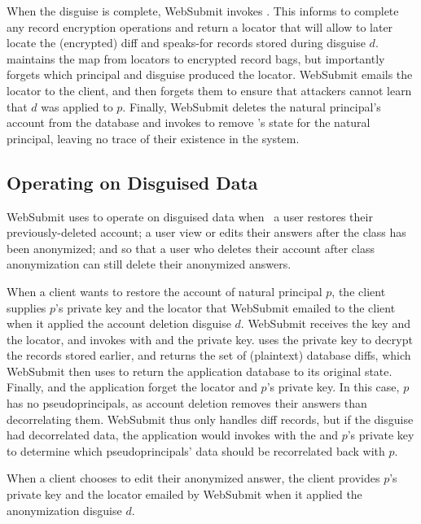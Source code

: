 %
When the disguise is complete, WebSubmit invokes .
%
This informs \sys to complete any record encryption operations and return a
locator  that will allow \sys to later locate the (encrypted) diff and
speaks-for records stored during disguise $d$.
%
\sys maintains the map from locators to encrypted record bags, but importantly
forgets which principal and disguise produced the locator.
%
WebSubmit emails the locator to the client, and then forgets them to ensure
that attackers cannot learn that $d$ was applied to $p$.
%
Finally, WebSubmit deletes the natural principal's account from the database and
invokes  to remove \sys's state for the natural principal,
leaving no trace of their existence in the system.
%

\subsection{Operating on Disguised Data}
\label{s:op-disg}

%
WebSubmit uses \sys to operate on disguised data when \one{} a user restores their
previously-deleted account; \two{} a user view or edits their answers after the
class has been anonymized; and \three{} so that a user who deletes their account
after class anonymization can still delete their anonymized answers.
%

%
When a client wants to restore the account of natural principal $p$, the client
supplies $p$'s private key and the locator  that WebSubmit emailed to
the client when it applied the account deletion disguise $d$.
%
WebSubmit receives the key and the locator, and invokes  with
 and the private key.
%
\sys uses the private key to decrypt the records stored earlier, and returns the
set of (plaintext) database diffs, which WebSubmit then uses to return the
application database to its original state.
%
Finally, \sys and the application forget the locator and $p$'s private key.
%
In this case, $p$ has no pseudoprincipals, as account deletion removes their
answers than decorrelating them.
%
WebSubmit thus only handles diff records, but if the disguise had decorrelated
data, the application would invokes  with the 
and $p$'s private key to determine which pseudoprincipals' data should be
recorrelated back with $p$.
%

%
When a client chooses to edit their anonymized answer, the client provides $p$'s
private key and the locator  emailed by WebSubmit when it applied
the anonymization disguise $d$.

